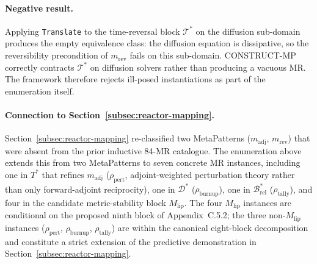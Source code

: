 \paragraph{Negative result.} Applying \texttt{Translate} to the time-reversal block $\mathcal{T}^{*}$ on the diffusion sub-domain produces the empty equivalence class: the diffusion equation is dissipative, so the reversibility precondition of $m_{\mathrm{rev}}$ fails on this sub-domain. CONSTRUCT-MP correctly contracts $\mathcal{T}^{*}$ on diffusion solvers rather than producing a vacuous MR. The framework therefore rejects ill-posed instantiations as part of the enumeration itself.

\paragraph{Connection to Section~\ref{subsec:reactor-mapping}.} Section~\ref{subsec:reactor-mapping} re-classified two MetaPatterns ($m_{\mathrm{adj}}$, $m_{\mathrm{rev}}$) that were absent from the prior inductive 84-MR catalogue. The enumeration above extends this from two MetaPatterns to seven concrete MR instances, including one in $T^{*}$ that refines $m_{\mathrm{adj}}$ ($\rho_{\mathrm{pert}}$, adjoint-weighted perturbation theory rather than only forward-adjoint reciprocity), one in $\mathcal{D}^{*}$ ($\rho_{\mathrm{burnup}}$), one in $\mathcal{B}^{*}_{\mathrm{rel}}$ ($\rho_{\mathrm{tally}}$), and four in the candidate metric-stability block $M_{\mathrm{lip}}$. The four $M_{\mathrm{lip}}$ instances are conditional on the proposed ninth block of Appendix~C.5.2; the three non-$M_{\mathrm{lip}}$ instances ($\rho_{\mathrm{pert}}$, $\rho_{\mathrm{burnup}}$, $\rho_{\mathrm{tally}}$) are within the canonical eight-block decomposition and constitute a strict extension of the predictive demonstration in Section~\ref{subsec:reactor-mapping}.

